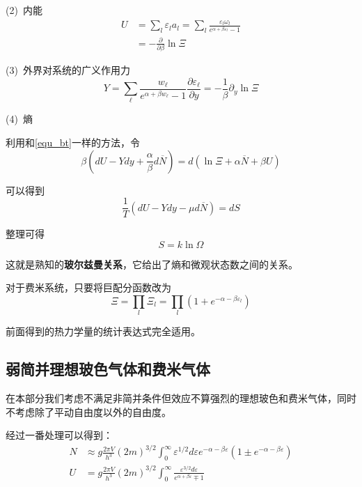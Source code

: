 \documentclass[UTF8]{ctexart}
\begin{document}
(2)\ 内能
	\begin{equation}
	\begin{aligned}
 	U&=\sum_{l} \varepsilon_{l} a_{l}=\sum_{l} \frac{\varepsilon_{l} \omega_{l}}{e^{\alpha+\beta \varepsilon_{l}}-1}\\
	&=-\frac{\partial}{\partial \beta} \ln \Xi
	\end{aligned}
	\end{equation}

(3)\ 外界对系统的广义作用力	
	\begin{equation}
 	Y=\sum_{\ell} \frac{w_{\ell}}{e^{\alpha+\beta w_{\ell}} - 1} \frac{\partial \varepsilon_{\ell}}{\partial y}=-\frac{1}{\beta} \partial_{y} \ln \Xi
	\end{equation}

(4)\ 熵

\noindent 利用和\ref{equ_bt}一样的方法，令
	\begin{equation}
	\beta\left(d U-Y d y+\frac{\alpha}{\beta} d \overline{N}\right)=d(\ln \Xi+\alpha \overline{N}+\beta U)
	\end{equation}

\noindent 可以得到
	\begin{equation}
	\frac{1}{T}(d U-Y d y-\mu d \overline{N})=d S
	\end{equation}

\noindent 整理可得
	\begin{equation}
 	S=k \ln \Omega 
	\end{equation}

\noindent 这就是熟知的\textbf{玻尔兹曼关系}，它给出了熵和微观状态数之间的关系。

	对于费米系统，只要将巨配分函数改为
	\begin{equation}
	\Xi = \prod_{l} \Xi_{l}=\prod_{l} \left(1+e^{-\alpha -\beta \varepsilon_{l}}\right) 
	\end{equation}

\noindent 前面得到的热力学量的统计表达式完全适用。

	\subsection{弱简并理想玻色气体和费米气体}
	在本部分我们考虑不满足非简并条件但效应不算强烈的理想玻色和费米气体，同时不考虑除了平动自由度以外的自由度。

	经过一番处理可以得到：
	\begin{equation}
	\begin{aligned}
N &\approx g \frac{2 \pi V}{h^{3}}(2 m)^{3 / 2} \int_{0}^{\infty} \varepsilon^{1 / 2} d \varepsilon e^{-\alpha-\beta \varepsilon}\left(1 \pm e^{-\alpha-\beta \varepsilon}\right)\\
U&=g \frac{2 \pi V}{h^{3}}(2 m)^{3 / 2} \int_{0}^{\infty} \frac{\varepsilon^{3 / 2} d \varepsilon}{e^{\alpha+\beta \varepsilon} \mp 1}
   	\end{aligned}	
	\end{equation}
\end{document}
